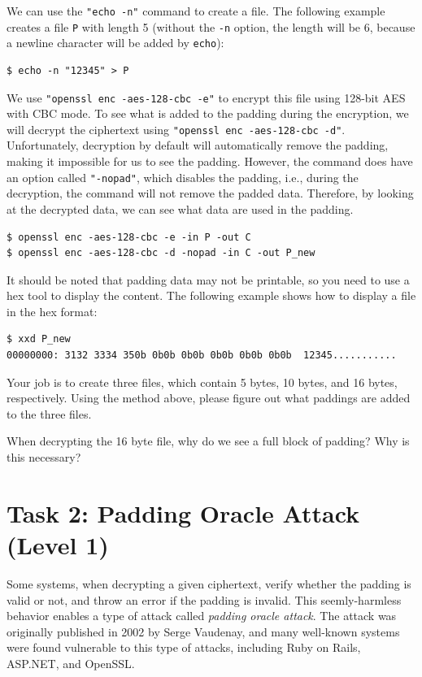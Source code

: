 We can use the \texttt{"echo -n"} command to create a file.
The following example
creates a file \texttt{P} with length 5 (without the \texttt{-n} option, the length will
be 6, because a newline character will be added by \texttt{echo}):

\begin{lstlisting}
$ echo -n "12345" > P
\end{lstlisting}

We use \texttt{"openssl enc -aes-128-cbc -e"} to encrypt this file
using 128-bit AES with CBC mode.
To see what is added to the padding during the encryption, 
we will decrypt the ciphertext using \texttt{"openssl enc -aes-128-cbc -d"}.
Unfortunately, decryption by default will automatically remove the padding, making it
impossible for us to see the padding. However, the command does have an option called
\texttt{"-nopad"}, which disables the padding, i.e., during the decryption, the command will not
remove the padded data. Therefore, by looking at the decrypted
data, we can see what data are used in the padding.

\begin{lstlisting}
$ openssl enc -aes-128-cbc -e -in P -out C
$ openssl enc -aes-128-cbc -d -nopad -in C -out P_new
\end{lstlisting}

It should be noted that padding data may not be printable, so you need to
use a hex tool to display the content. The following example shows
how to display a file in the hex format:

\begin{lstlisting}
$ xxd P_new
00000000: 3132 3334 350b 0b0b 0b0b 0b0b 0b0b 0b0b  12345...........
\end{lstlisting}

Your job is to create three files, which contain 5 bytes, 10 bytes, and 16 bytes, respectively.
Using the method above, please figure out what paddings are added to the three files.

When decrypting the 16 byte file, why do we see a full block of padding? Why is this necessary?

\section{Task 2: Padding Oracle Attack (Level 1)}

Some systems, when decrypting a given ciphertext,
verify whether the padding is valid or not,  
and throw an error if the padding is invalid. This 
seemly-harmless behavior enables a type of attack 
called \textit{padding oracle attack}.
The attack was originally published in 2002 by Serge Vaudenay, and 
many well-known systems were found vulnerable to this type of 
attacks, including Ruby on Rails, ASP.NET, and OpenSSL. 



